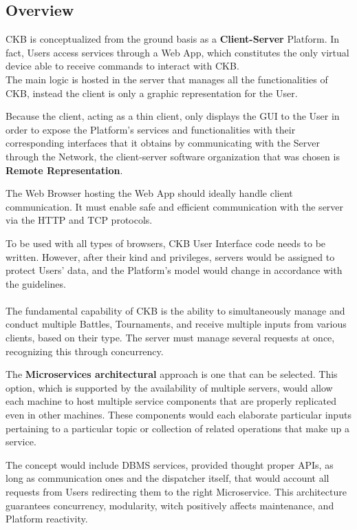 \subsection{Overview}
CKB is conceptualized from the ground basis as a \textbf{Client-Server} Platform. In fact, Users access services through a Web App, which constitutes the only virtual device able to receive commands to interact 
with CKB.
\\
The main logic is hosted in the server that manages all the functionalities of CKB, instead the client is only a graphic representation for the User.

Because the client, acting as a thin client, only displays the GUI to the User in order to expose the Platform's services and functionalities with their corresponding interfaces that it obtains by communicating with the Server through 
the Network, the client-server software organization that was chosen is \textbf{Remote Representation}.

The Web Browser hosting the Web App should ideally handle client communication. It must enable safe and efficient communication with the server via the HTTP and TCP protocols. 

To be used with all types of browsers, CKB User Interface code needs to be written. However, after their kind and privileges, servers would be assigned to protect Users' data, and the Platform's model would change in accordance 
with the guidelines.\\
\\
The fundamental capability of CKB is the ability to simultaneously manage and conduct multiple Battles, Tournaments, and receive multiple inputs from various clients, based on their type. 
The server must manage several requests at once, recognizing this through concurrency.

The \textbf{Microservices architectural} approach is one that can be selected. This option, which is supported by the availability of multiple servers, would allow each machine to host multiple service components that are properly 
replicated even in other machines. These components would each elaborate particular inputs pertaining to a particular topic or collection of related operations that make up a service.

The concept would include DBMS services, provided thought proper APIs, as long as communication ones and the dispatcher itself, that would account all requests from Users redirecting them to the 
right Microservice. This architecture guarantees concurrency, modularity, witch positively affects maintenance, and Platform reactivity.

